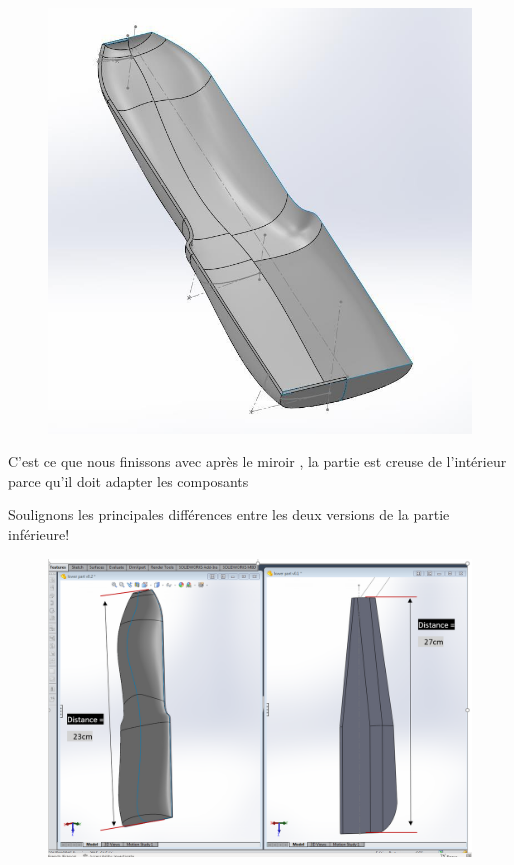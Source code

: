 \begin{figure}[!htbp]
    \centering
    \includegraphics[width=\linewidth]{assets/conception1/img180.jpg}
\end{figure}

\FloatBarrier

C’est ce que nous finissons avec après le miroir , la partie est creuse de l’intérieur parce qu’il doit adapter les composants

Soulignons les principales différences entre les deux versions de la partie inférieure!

\begin{figure}[!htbp]
    \centering
    \includegraphics[width=\linewidth]{assets/conception1/8.png}
\end{figure}

